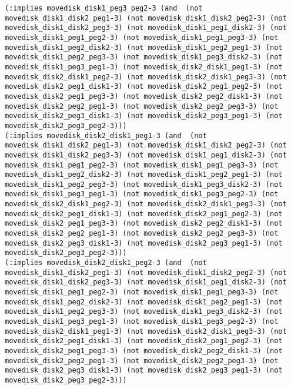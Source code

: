 \documentclass[12pt,letterpaper]{ntdhw}
\begin{document}
\begin{enumerate}
\begin{enumerate}
\begin{lstlisting}[language=pddl, style=pddlstyle,
  basicstyle=\scriptsize]
(:implies movedisk_disk1_peg3_peg2-3 (and  (not movedisk_disk1_disk2_peg1-3) (not movedisk_disk1_disk2_peg2-3) (not movedisk_disk1_disk2_peg3-3) (not movedisk_disk1_peg1_disk2-3) (not movedisk_disk1_peg1_peg2-3) (not movedisk_disk1_peg1_peg3-3) (not movedisk_disk1_peg2_disk2-3) (not movedisk_disk1_peg2_peg1-3) (not movedisk_disk1_peg2_peg3-3) (not movedisk_disk1_peg3_disk2-3) (not movedisk_disk1_peg3_peg1-3) (not movedisk_disk2_disk1_peg1-3) (not movedisk_disk2_disk1_peg2-3) (not movedisk_disk2_disk1_peg3-3) (not movedisk_disk2_peg1_disk1-3) (not movedisk_disk2_peg1_peg2-3) (not movedisk_disk2_peg1_peg3-3) (not movedisk_disk2_peg2_disk1-3) (not movedisk_disk2_peg2_peg1-3) (not movedisk_disk2_peg2_peg3-3) (not movedisk_disk2_peg3_disk1-3) (not movedisk_disk2_peg3_peg1-3) (not movedisk_disk2_peg3_peg2-3)))
(:implies movedisk_disk2_disk1_peg1-3 (and  (not movedisk_disk1_disk2_peg1-3) (not movedisk_disk1_disk2_peg2-3) (not movedisk_disk1_disk2_peg3-3) (not movedisk_disk1_peg1_disk2-3) (not movedisk_disk1_peg1_peg2-3) (not movedisk_disk1_peg1_peg3-3) (not movedisk_disk1_peg2_disk2-3) (not movedisk_disk1_peg2_peg1-3) (not movedisk_disk1_peg2_peg3-3) (not movedisk_disk1_peg3_disk2-3) (not movedisk_disk1_peg3_peg1-3) (not movedisk_disk1_peg3_peg2-3) (not movedisk_disk2_disk1_peg2-3) (not movedisk_disk2_disk1_peg3-3) (not movedisk_disk2_peg1_disk1-3) (not movedisk_disk2_peg1_peg2-3) (not movedisk_disk2_peg1_peg3-3) (not movedisk_disk2_peg2_disk1-3) (not movedisk_disk2_peg2_peg1-3) (not movedisk_disk2_peg2_peg3-3) (not movedisk_disk2_peg3_disk1-3) (not movedisk_disk2_peg3_peg1-3) (not movedisk_disk2_peg3_peg2-3)))
(:implies movedisk_disk2_disk1_peg2-3 (and  (not movedisk_disk1_disk2_peg1-3) (not movedisk_disk1_disk2_peg2-3) (not movedisk_disk1_disk2_peg3-3) (not movedisk_disk1_peg1_disk2-3) (not movedisk_disk1_peg1_peg2-3) (not movedisk_disk1_peg1_peg3-3) (not movedisk_disk1_peg2_disk2-3) (not movedisk_disk1_peg2_peg1-3) (not movedisk_disk1_peg2_peg3-3) (not movedisk_disk1_peg3_disk2-3) (not movedisk_disk1_peg3_peg1-3) (not movedisk_disk1_peg3_peg2-3) (not movedisk_disk2_disk1_peg1-3) (not movedisk_disk2_disk1_peg3-3) (not movedisk_disk2_peg1_disk1-3) (not movedisk_disk2_peg1_peg2-3) (not movedisk_disk2_peg1_peg3-3) (not movedisk_disk2_peg2_disk1-3) (not movedisk_disk2_peg2_peg1-3) (not movedisk_disk2_peg2_peg3-3) (not movedisk_disk2_peg3_disk1-3) (not movedisk_disk2_peg3_peg1-3) (not movedisk_disk2_peg3_peg2-3)))

\end{lstlisting}
\end{enumerate}
\end{enumerate}
\end{document}
